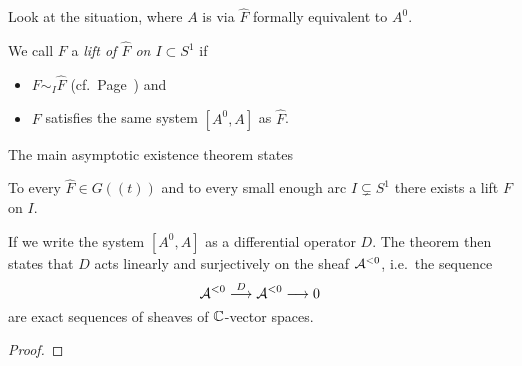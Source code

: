Look at the situation, where $A$ is via $\hat F$ formally equivalent to $A^0$.

\begin{defn}
  We call $F$ a \emph{lift of $\hat F$ on $I\subset S^1$} if
  \begin{itemize}
    \item $F\sim_I\hat F$
      (cf.\ Page~\pageref{page:notationForAsymptoticExpansion}) and
    \item $F$ satisfies the same system $[A^0,A]$ as $\hat F$.
  \end{itemize}
\end{defn}
The main asymptotic existence theorem states
\begin{thm}[M.E.A.T]\label{thm:meat}
  To every $\hat F\in G(\!(t)\!)$ and to every small enough arc
  $I\subsetneq S^1$ there exists a lift $F$ on $I$.
  \begin{s-rem}
    If we write the system $[A^0,A]$ as a differential operator $D$.
    The theorem then states that $D$ acts linearly and surjectively on the
    sheaf $\mathcal{A}^{<0}$, i.e.\ the sequence
    \[
      \mathcal{A}^{<0}\overset{D}\longrightarrow\mathcal{A}^{<0} \longrightarrow 0
    \]
    are exact sequences of sheaves of $\mathbb{C}$-vector spaces.
    \begin{comment}
      Proof in \textbf{[Mal91a, App 1; Thm 1]}
    \end{comment}
  \end{s-rem}
\end{thm}
\begin{proof}
  \TODO{}
\end{proof}

\begin{comment}
  \begin{rem}
    We are then able to find a \rewrite{(cyclic)} covering of the $S^1$ of
    arcs such that on every arc there exists a lift $\tilde F$ of $\hat F$.
  \end{rem}
\end{comment}
\TODO{}

